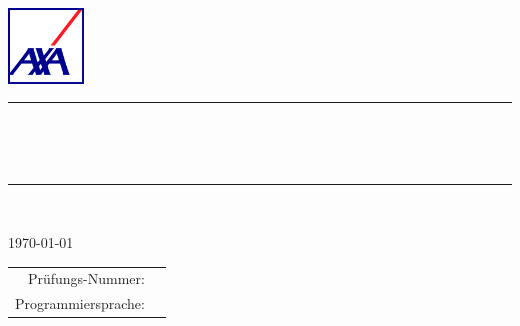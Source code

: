 \begin{titlepage}
	\thispagestyle{empty}

	\begin{flushright}
		\includegraphics[height=2cm]{images/axa_logo_open_blue_rgb}
	\end{flushright}

	\vspace{1.9cm}

	\begin{center}
		\rule{0.95\textwidth}{1pt}\\[.3cm]
		\begin{minipage}{0.9\textwidth}
			\renewcommand{\baselinestretch}{1.3}
			\begin{center}
				\LARGE \textbf{\ArbeitTitelseite}
			\end{center}
		\end{minipage}\\[.3cm]
		\rule{0.95\textwidth}{1pt}\\

		\vspace{2cm}

		\today

		\vspace{2cm}

		{\large \textbf{\authorDocument}}

		\vspace{2.0cm}

		\begin{tabular}{rl}
			Prüfungs-Nummer: & \Pruefungsnummer\\[.3cm]
			Programmiersprache: & \Programmiersprache\\[.3cm]
		\end{tabular}

		\vspace{1.9cm}

		\clearpage
		\thispagestyle{empty}
	\end{center}
\end{titlepage}
